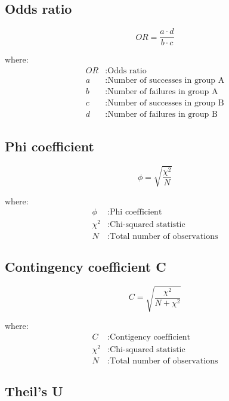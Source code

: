 \subsection{Odds ratio} \label{ap1:oddsratio}

\begin{equation}
OR = \frac{{a \cdot d}}{{b \cdot c}}
\end{equation}

where:
\begin{align*}
OR & : \text{Odds ratio} \\
a & : \text{Number of successes in group A} \\
b & : \text{Number of failures in group A} \\
c & : \text{Number of successes in group B} \\
d & : \text{Number of failures in group B}
\end{align*}

\subsection{Phi coefficient} \label{ap1:phi}

\begin{equation}
\phi = \sqrt{\frac{\chi^2}{N}}
\end{equation}

where:
\begin{align*}
\phi & : \text{Phi coefficient} \\
\chi^2 & : \text{Chi-squared statistic} \\
N & : \text{Total number of observations}
\end{align*}

\subsection{Contingency coefficient C} \label{ap1:contingencyc}

\begin{equation}
C = \sqrt{\frac{\chi^2}{N + \chi^2}}
\end{equation}

where:
\begin{align*}
C & : \text{Contigency coefficient} \\
\chi^2 & : \text{Chi-squared statistic} \\
N & : \text{Total number of observations}
\end{align*}


\subsection{Theil's U} \label{ap1:theilsu}

